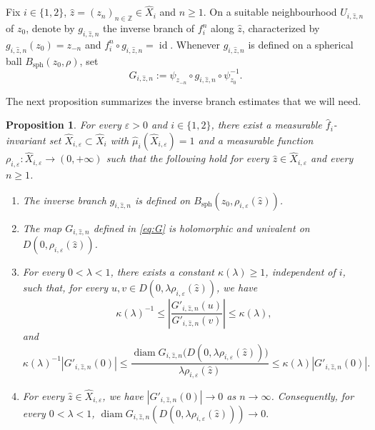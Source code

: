 \documentclass[11pt]{amsart}
\numberwithin{equation}{section}
\theoremstyle{plain}
\newtheorem{prop}[thm]{Proposition}
\theoremstyle{definition}
\theoremstyle{remark}
\begin{document}
Fix $i\in\{1,2\}$, 
$\hat z=(z_n)_{n\in\mathbb Z}\in\hat X_i$ and 
$n\geq1$.
On a suitable neighbourhood $U_{i,\hat z,n}$ of $z_0$, denote by
$g_{i,\hat z,n}$ the inverse branch of $f_i^n$ along $\hat z$,
characterized by
$g_{i,\hat z,n}(z_0)=z_{-n}$ and
$f_i^n\circ g_{i,\hat z,n}=\operatorname{id}$.
Whenever $g_{i,\hat z,n}$ is defined on a spherical ball
$B_{\mathrm{sph}}(z_0,\rho)$, set
\begin{equation}\label{eq:G}
G_{i,\hat z,n}
:=
\psi_{z_{-n}}
\circ
g_{i,\hat z,n}
\circ
\psi_{z_0}^{-1}.
\end{equation}

The next proposition summarizes the inverse branch estimates that we will need.

\begin{prop}
\label{prop:inverse branch-package}
For every $\varepsilon>0$ and $i\in\{1,2\}$, there exist a measurable
$\hat f_i$-invariant set
$\hat X_{i,\varepsilon}\subset\hat X_i$ with
$\hat\mu_i(\hat X_{i,\varepsilon})=1$ and a measurable function
$\rho_{i,\varepsilon}\colon
\hat X_{i,\varepsilon}\to(0,+\infty)$
such that the following hold for every
$\hat z\in\hat X_{i,\varepsilon}$ and every $n\geq1$.

\begin{enumerate}
\item
The inverse branch $g_{i,\hat z,n}$ is defined on
$B_{\mathrm{sph}}(z_0,\rho_{i,\varepsilon}(\hat z))$.

\item
The map $G_{i,\hat z,n}$ defined in \eqref{eq:G} is holomorphic and
univalent on
$D(0,\rho_{i,\varepsilon}(\hat z))$.

\item
For every $0<\lambda<1$, there exists a constant
$\kappa(\lambda)\geq1$, independent of $i$, such that, for every
$u,v\in
D(0,\lambda\rho_{i,\varepsilon}(\hat z))$,
we have
$$
\kappa(\lambda)^{-1}
\leq
\left|
\frac{G'_{i,\hat z,n}(u)}
     {G'_{i,\hat z,n}(v)}
\right|
\leq
\kappa(\lambda),
$$
and
$$
\kappa(\lambda)^{-1}|G'_{i,\hat z,n}(0)|
\leq
\frac{
\operatorname{diam}
G_{i,\hat z,n}
\bigl(D(0,\lambda\rho_{i,\varepsilon}(\hat z))\bigr)
}{
\lambda\rho_{i,\varepsilon}(\hat z)
}
\leq
\kappa(\lambda)|G'_{i,\hat z,n}(0)|.
$$

\item
For every $\hat z\in\hat X_{i,\varepsilon}$, we have
$
|G'_{i,\hat z,n}(0)|\to0
$
as $n\to\infty$. Consequently, for every $0<\lambda<1$,
$
\operatorname{diam}
G_{i,\hat z,n}
(D(0,\lambda\rho_{i,\varepsilon}(\hat z)))\to0.
$
\end{enumerate}
\end{prop}
\end{document}
